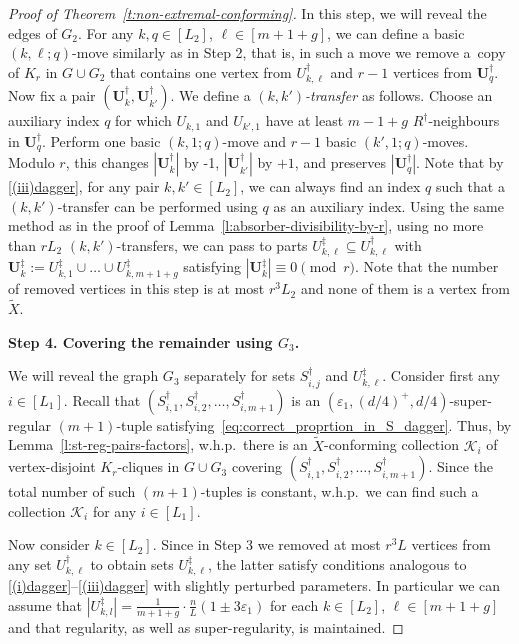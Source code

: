 \documentclass[reqno, 12pt]{amsart}
\numberwithin{equation}{section}
\numberwithin{figure}{section}
\theoremstyle{plain}
\theoremstyle{definition}
\let\eps=\varepsilon
\def\cK{{\mathcal K}}
\def\Ub{\mathbf{U}}
\begin{document}
\begin{proof}[Proof of Theorem~\ref{t:non-extremal-conforming}]
    In this step, we will reveal the edges of $G_2$. For any $k,q\in[L_2]$, $\ell\in[m+1+g]$, we can define a basic $(k,\ell;q)$-move similarly as in Step 2, that is, in such a move we remove a~copy of $K_r$ in $G \cup G_2$ that contains one vertex from $U_{k,\ell}^\dagger$ and $r-1$ vertices from $\Ub_{q}^\dagger$.
    Now fix a pair $(\Ub_k^\dagger, \Ub_{k'}^\dagger)$. We define a \emph{$(k,k')$-transfer} as follows. Choose an auxiliary index $q$ for which $U_{k,1}$ and $U_{k',1}$ have at least $m-1+g$ $R^\dagger$-neighbours in $\Ub_{q}^\dagger$. Perform one basic $(k,1;q)$-move and $r-1$ basic $(k',1;q)$-moves. Modulo $r$, this changes $|\Ub_k^\dagger|$ by -1, $|\Ub_{k'}^\dagger|$ by $+1$, and preserves $|\Ub_{q}^\dagger|$. Note that by \ref{(iii)dagger}, for any pair $k, k' \in [L_2]$, we can always find an index $q$ such that a $(k,k')$-transfer can be performed using $q$ as an auxiliary index. Using the same method as in the proof of Lemma~\ref{l:absorber-divisibility-by-r}, using no more than $rL_2$ $(k,k')$-transfers, we can pass to parts $U_{k,\ell}^\ddagger\subseteq U_{k,\ell}^\dagger$ with $\Ub_k^\ddagger := U_{k,1}^\ddagger \cup \dots \cup U_{k,m+1+g}^\ddagger$ satisfying $|\Ub_k^\ddagger| \equiv 0 \pmod{r}$. Note that the number of removed vertices in this step is at most $r^3L_2$ and none of them is a vertex from $\tilde X$.

    \smallskip
    
    \textbf{Step 4. Covering the remainder using $G_3$.}

    \smallskip

    We will reveal the graph $G_3$ separately for sets $S_{i,j}^\dagger$ and $U_{k,\ell}^\ddagger$.
    Consider first any $i \in [L_1]$. Recall that $(S_{i,1}^\dagger,S_{i,2}^\dagger,\dots, S_{i,m+1}^\dagger)$ is an $(\eps_1,(d/4)^+,d/4)$-super-regular $(m+1)$-tuple satisfying~\eqref{eq:correct_proprtion_in_S_dagger}. Thus, by Lemma~\ref{l:st-reg-pairs-factors}, w.h.p.~there is an $\tilde X$-conforming collection $\cK_i$ of vertex-disjoint $K_r$-cliques in $G \cup G_3$ covering  $(S_{i,1}^\dagger,S_{i,2}^\dagger,\dots, S_{i,m+1}^\dagger)$. Since the total number of such $(m+1)$-tuples is constant, w.h.p.~we can find such a collection $\cK_i$ for any $i\in[L_1]$. 
    
    Now consider $k\in[L_2]$. Since in Step 3 we removed at most $r^3L$ vertices from any set $U_{k,\ell}^\dagger$ to obtain sets $U_{k,\ell}^\ddagger$, the latter satisfy conditions analogous to \ref{(i)dagger}--\ref{(iii)dagger} with slightly perturbed parameters. In particular we can assume that $|U_{k,l}^\ddagger|=\frac{1}{m+1+g}\cdot\frac{n}{L}(1\pm3\eps_1)$ for each $k\in[L_2]$, $\ell\in[m+1+g]$ and that regularity, as well as super-regularity, is maintained.


\end{proof}
\end{document}

